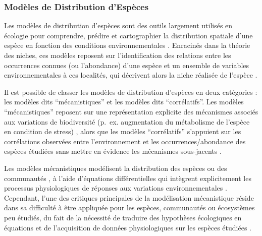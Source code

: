\begin{refsection}
\hypertarget{moduxe8les-de-distribution-despuxe8ces}{%
\subsubsection{Modèles de Distribution
d'Espèces}\label{moduxe8les-de-distribution-despuxe8ces}}

Les modèles de distribution d'espèces sont des outils largement utilisés
en écologie pour comprendre, prédire et cartographier la distribution
spatiale d'une espèce en fonction des conditions environnementales
\autocite{Guisan_2000}. Enracinés dans la théorie des niches, ces
modèles reposent sur l'identification des relations entre les
occurrences connues (ou l'abondance) d'une espèce et un ensemble de
variables environnementales à ces localités, qui décrivent alors la
niche réalisée de l'espèce \autocite{Guisan_2017}.

Il est possible de classer les modèles de distribution d'espèces en deux
catégories : les modèles dits ``mécanistiques'' et les modèles dits
``corrélatifs''. Les modèles ``mécanistiques'' reposent sur une
représentation explicite des mécanismes associés aux variations de
biodiversité (p.~ex. augmentation du métabolisme de l'espèce en
condition de stress) \autocite{Kearney_2010}, alors que les modèles
``corrélatifs'' s'appuient sur les corrélations observées entre
l'environnement et les occurrences/abondance des espèces étudiées sans
mettre en évidence les mécanismes sous-jacents \autocite{Briscoe_2023}.

Les modèles mécanistiques modélisent la distribution des espèces ou des
communautés \autocite{Harfoot_2014}, à l'aide d'équations
différentielles qui intègrent explicitement les processus physiologiques
de réponses aux variations environnementales \autocite{Kearney_2009}.
Cependant, l'une des critiques principales de la modélisation
mécanistique réside dans sa difficulté à être appliquée pour les
espèces, communautés ou écosystèmes peu étudiés, du fait de la nécessité
de traduire des hypothèses écologiques en équations
\autocite{Evans_2015} et de l'acquisition de données physiologiques sur
les espèces étudiées \autocite{Gandra_2015}.


\end{refsection}
